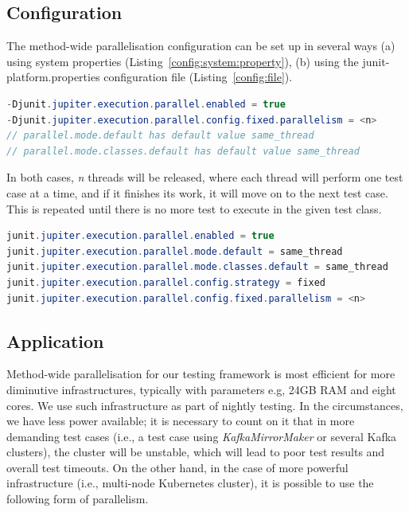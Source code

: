 \subsection{Configuration}
\label{05:sub:sec:configuration}

The method-wide parallelisation configuration can be set up in several ways (a) using system properties (Listing~\ref{config:system:property}),
(b) using the junit-platform.properties configuration file (Listing~\ref{config:file}).
\begin{lstlisting}[language= Java,label=config:system:property,caption=(a) Configuration via system properties,frame=tb]
-Djunit.jupiter.execution.parallel.enabled = true
-Djunit.jupiter.execution.parallel.config.fixed.parallelism = <n>
// parallel.mode.default has default value same_thread
// parallel.mode.classes.default has default value same_thread
\end{lstlisting}
In both cases, \emph{n} threads will be released, where each thread will perform one test case at a time, and if it finishes its work,
it will move on to the next test case. This is repeated until there is no more test to execute in the given test class.
\begin{lstlisting}[language=Java,label=config:file,caption=(b) Configuration via file,frame = tb]
junit.jupiter.execution.parallel.enabled = true
junit.jupiter.execution.parallel.mode.default = same_thread
junit.jupiter.execution.parallel.mode.classes.default = same_thread
junit.jupiter.execution.parallel.config.strategy = fixed
junit.jupiter.execution.parallel.config.fixed.parallelism = <n>
\end{lstlisting}

\subsection{Application}
\label{05:sub:sec:applicability}

Method-wide parallelisation for our testing framework is most efficient for more diminutive infrastructures,
typically with parameters e.g, 24GB RAM and eight cores. We use such infrastructure as part of nightly testing.
In the circumstances, we have less power available; it is necessary to count on it that in more demanding test cases
(i.e., a test case using \emph{KafkaMirrorMaker} or several Kafka clusters), the cluster will be unstable, which will
lead to poor test results and overall test timeouts. On the other hand, in the case of more powerful infrastructure
(i.e., multi-node Kubernetes cluster), it is possible to use the following form of parallelism.

